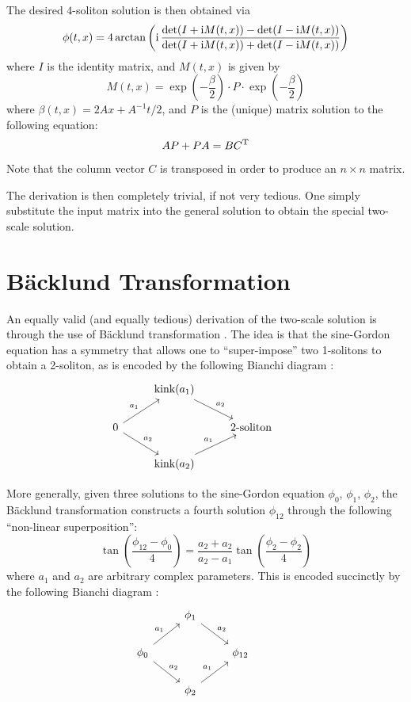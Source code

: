 \documentclass{report}
\def\ii{{\rm i}}
\begin{document}
The desired $4$-soliton solution is then obtained via
\begin{equation}
  \phi(t,x) = 4\arctan \left(\ii\,\frac{\det(I + \ii M(t,x))-\det(I - \ii M(t,x))}{\det(I + \ii M(t,x))+\det(I - \ii M(t,x))}\right)
\end{equation}
where $I$ is the identity matrix, and $M(t,x)$ is given by
\begin{equation}
  M(t,x) = \exp\left(-\frac{\beta}{2}\right)\cdot P \cdot \exp\left(-\frac{\beta}{2}\right)
\end{equation}
where $\beta(t,x) = 2Ax+A^{-1}t/2$, and $P$ is the (unique) matrix solution to the following equation:
\begin{equation}
  AP + PA = B C^{\rm T}
\end{equation}
Note that the column vector $C$ is transposed in order to produce an $n\times n$ matrix.

The derivation is then completely trivial, if not very tedious. One simply substitute the input matrix into the general solution to obtain the special two-scale solution.

\section{B\"acklund Transformation}
An equally valid (and equally tedious) derivation of the two-scale solution is through the use of B\"acklund transformation \cite{Dodd499, hietarinta1997introduction, Cuenda20111047}. The idea is that the sine-Gordon equation has a symmetry that allows one to ``super-impose'' two 1-solitons to obtain a 2-soliton, as is encoded by the following Bianchi diagram \cite{Cuenda20111047}:
\[
\begin{tikzcd}
  & \text{kink}(a_1) \arrow{dr}{a_2} &&\\
  0\arrow{ur}{a_1}\arrow{dr}{a_2}&&\text{2-soliton}&\\
 &\text{kink}(a_2)\arrow{ur}{a_1}&&
\end{tikzcd}
\]

More generally, given three solutions to the sine-Gordon equation $\phi_0$, $\phi_1$, $\phi_2$, the B\"acklund transformation constructs a fourth solution $\phi_{12}$ through the following ``non-linear superposition'':
\begin{equation}
  \tan \left(\frac{\phi_{12}-\phi_0}{4}\right) = \frac{a_2+a_2}{a_2-a_1} \tan \left(\frac{\phi_2-\phi_2}{4}\right)
\end{equation}
where $a_1$ and $a_2$ are arbitrary complex parameters. This is encoded succinctly by the following Bianchi diagram \cite{Cuenda20111047}:
\[
\begin{tikzcd}
  & \phi_1 \arrow{dr}{a_2} &&\\
  \phi_0\arrow{ur}{a_1}\arrow{dr}{a_2}&&\phi_{12}&\\
 &\phi_2\arrow{ur}{a_1}&&
\end{tikzcd}
\]
\end{document}
